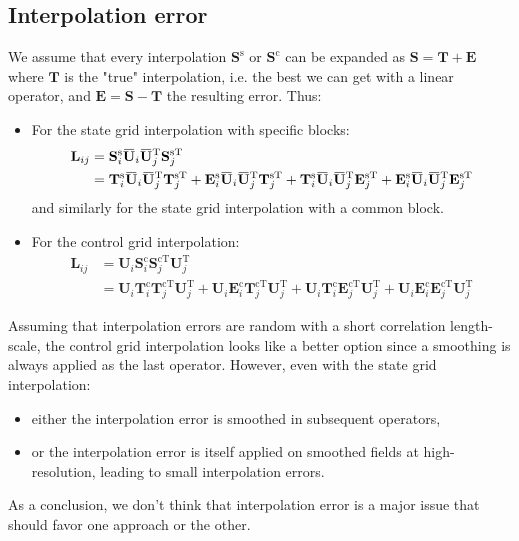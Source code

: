 \documentclass[12pt]{scrartcl}
\newcommand{\overbar}[1]{\mkern 1.5mu\overline{\mkern-1.5mu#1\mkern-1.5mu}\mkern 1.5mu}
\begin{document}
\subsection{Interpolation error}
We assume that every interpolation $\mathbf{S}^\mathrm{s}$ or $\mathbf{S}^\mathrm{c}$ can be expanded as $\mathbf{S} = \mathbf{T} + \mathbf{E}$ where $\mathbf{T}$ is the "true" interpolation, i.e. the best we can get with a linear operator, and $\mathbf{E} = \mathbf{S} - \mathbf{T}$ the resulting error. 
Thus:
\begin{itemize}
\item For the state grid interpolation with specific blocks:
\begin{align}
\mathbf{L}_{ij} & = \mathbf{S}^\mathrm{s}_i \overbar{\mathbf{U}}_i \overbar{\mathbf{U}}_j^\mathrm{T} \mathbf{S}_j^{\mathrm{s} \mathrm{T}} \nonumber \\
& = \mathbf{T}^\mathrm{s}_i \overbar{\mathbf{U}}_i \overbar{\mathbf{U}}_j^\mathrm{T} \mathbf{T}_j^{\mathrm{s} \mathrm{T}} + \mathbf{E}^\mathrm{s}_i \overbar{\mathbf{U}}_i \overbar{\mathbf{U}}_j^\mathrm{T} \mathbf{T}_j^{\mathrm{s} \mathrm{T}} + \mathbf{T}^\mathrm{s}_i \overbar{\mathbf{U}}_i \overbar{\mathbf{U}}_j^\mathrm{T} \mathbf{E}_j^{\mathrm{s} \mathrm{T}} + \mathbf{E}^\mathrm{s}_i \overbar{\mathbf{U}}_i \overbar{\mathbf{U}}_j^\mathrm{T} \mathbf{E}_j^{\mathrm{s} \mathrm{T}}
\end{align}
and similarly for the state grid interpolation with a common block.
\item For the control grid interpolation:
\begin{align}
\mathbf{L}_{ij} & = \mathbf{U}_i \mathbf{S}^\mathrm{c}_i \mathbf{S}_j^{\mathrm{c} \mathrm{T}} \mathbf{U}_j^\mathrm{T} \nonumber \\
& = \mathbf{U}_i \mathbf{T}^\mathrm{c}_i \mathbf{T}_j^{\mathrm{c} \mathrm{T}} \mathbf{U}_j^\mathrm{T} + \mathbf{U}_i \mathbf{E}^\mathrm{c}_i \mathbf{T}_j^{\mathrm{c} \mathrm{T}} \mathbf{U}_j^\mathrm{T} + \mathbf{U}_i \mathbf{T}^\mathrm{c}_i \mathbf{E}_j^{\mathrm{c} \mathrm{T}} \mathbf{U}_j^\mathrm{T} + \mathbf{U}_i \mathbf{E}^\mathrm{c}_i \mathbf{E}_j^{\mathrm{c} \mathrm{T}} \mathbf{U}_j^\mathrm{T}
\end{align}
\end{itemize}
Assuming that interpolation errors are random with a short correlation length-scale, the control grid interpolation looks like a better option since a smoothing is always applied as the last operator. However, even with the state grid interpolation: 
\begin{itemize}
\item either the interpolation error is smoothed in subsequent operators,
\item or the interpolation error is itself applied on smoothed fields at high-resolution, leading to small interpolation errors.
\end{itemize}
As a conclusion, we don't think that interpolation error is a major issue that should favor one approach or the other.
\end{document}
